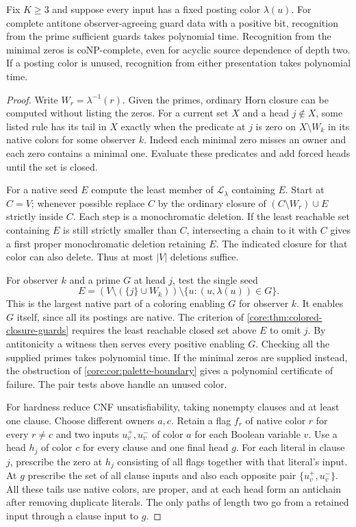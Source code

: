 \begin{theorem}
\label{core:thm:palette-presentation}
Fix $K\ge3$ and suppose every input has a fixed posting color
$\lambda(u)$. For complete antitone observer-agreeing guard data with
a positive bit, recognition from the prime sufficient guards takes
polynomial time. Recognition from the minimal zeros is coNP-complete,
even for acyclic source dependence of depth two. If a posting color is
unused, recognition from either presentation takes polynomial time.
\end{theorem}
\begin{proof}
Write $W_r=\lambda^{-1}(r)$. Given the primes, ordinary Horn closure
can be computed without listing the zeros. For a current set $X$ and
a head $j\notin X$, some listed rule has its tail in $X$ exactly when
the predicate at $j$ is zero on $X\setminus W_k$ in its native
colors for some observer $k$. Indeed each minimal zero misses an
owner and each zero contains a minimal one. Evaluate these predicates
and add forced heads until the set is closed.

For a native seed $E$ compute the least member of $\mathcal L_\lambda$
containing $E$. Start at $C=V$; whenever possible replace $C$ by
the ordinary closure of $(C\setminus W_r)\cup E$ strictly inside
$C$. Each step is a monochromatic deletion. If the least reachable
set containing $E$ is still strictly smaller than $C$, intersecting
a chain to it with $C$ gives a first proper monochromatic deletion
retaining $E$. The indicated closure for that color can also delete.
Thus at most $|V|$ deletions suffice.

For observer $k$ and a prime $G$ at head $j$, test the single seed
\[
 E=(V\setminus(\{j\}\cup W_k))\setminus
       \{u:(u,\lambda(u))\in G\}.
\]
This is the largest native part of a coloring enabling $G$ for
observer $k$. It enables $G$ itself, since all its postings are
native. The criterion of \cref{core:thm:colored-closure-guards}
requires the least reachable closed set above $E$ to omit $j$.
By antitonicity a witness then serves every positive enabling $G$.
Checking all the supplied primes takes polynomial time. If the
minimal zeros are supplied instead, the obstruction of
\cref{core:cor:palette-boundary} gives a polynomial certificate of
failure. The pair tests above handle an unused color.

For hardness reduce CNF unsatisfiability, taking nonempty clauses
and at least one clause. Choose different owners $a,c$. Retain a
flag $f_r$ of native color $r$ for every $r\ne c$ and two inputs
$u_v^+,u_v^-$ of color $a$ for each Boolean variable $v$.
Use a head $h_j$ of color $c$ for every clause and one final head
$g$. For each literal in clause $j$, prescribe the zero at $h_j$
consisting of all flags together with that literal's input. At $g$
prescribe the set of all clause inputs and also each opposite pair
$\{u_v^+,u_v^-\}$. All these tails use native colors, are proper,
and at each head form an antichain after removing duplicate literals.
The only paths of length two go from a retained input through a
clause input to $g$.


\end{proof}
